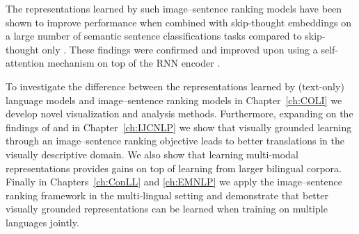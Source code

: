 
The representations learned by such image--sentence  ranking models have
been shown
to improve performance when combined with skip-thought embeddings
on a large number of semantic sentence classifications tasks compared to
skip-thought only \citep{kiela2017learning}. These findings were confirmed and improved upon using a
self-attention mechanism on top of the RNN encoder \citep{yoo2017improving}.

To investigate the difference between the representations learned by (text-only) language
models and image--sentence ranking models in Chapter~\ref{ch:COLI} we develop 
novel visualization and analysis methods. Furthermore,
expanding on the findings of \citep{kiela2017learning} and \citep{yoo2017improving} 
in Chapter~\ref{ch:IJCNLP} we show that
visually grounded learning through an image--sentence ranking objective 
leads to better translations in the visually descriptive domain. We also
show that learning multi-modal representations provides gains on top of learning
from larger bilingual corpora.
Finally in Chapters~\ref{ch:ConLL} and \ref{ch:EMNLP} we apply the image--sentence ranking
framework \citep{vendrov2016order,faghri2017vse++} in the multi-lingual setting and demonstrate
that better visually grounded representations can be learned when training on multiple
languages jointly.





